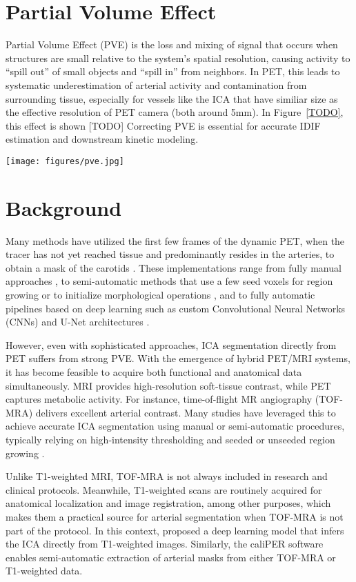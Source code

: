 \section{Partial Volume Effect}
Partial Volume Effect (PVE) is
the loss and mixing of signal that occurs when structures are small relative to the system’s spatial resolution, causing activity to “spill out” of small objects and “spill in” from neighbors.
In PET, this leads to systematic underestimation of arterial activity and contamination from surrounding tissue, especially for vessels like the ICA that have similiar size as the effective resolution of PET camera (both around 5mm).
In Figure~\ref{TODO}, this effect is shown [TODO]
Correcting PVE is essential for accurate IDIF estimation and downstream kinetic modeling.

\texttt{[image: figures/pve.jpg]}
\section{Background}
Many methods have utilized the first few frames of the dynamic PET, when the tracer has not yet reached tissue and predominantly resides in the arteries, to obtain a mask of the carotids \cite{young2023image}.
These implementations range from fully manual approaches \cite{TODO}, to semi-automatic methods that use a few seed voxels for region growing or to initialize morphological operations \cite{TODO}, and to fully automatic pipelines based on deep learning such as custom Convolutional Neural Networks (CNNs) \cite{TODO} and U-Net architectures \cite{TODO}.

However, even with sophisticated approaches, ICA segmentation directly from PET suffers from strong PVE.
With the emergence of hybrid PET/MRI systems, it has become feasible to acquire both functional and anatomical data simultaneously.
MRI provides high-resolution soft-tissue contrast, while PET captures metabolic activity.
For instance, time-of-flight MR angiography (TOF-MRA) delivers excellent arterial contrast.
Many studies have leveraged this to achieve accurate ICA segmentation using manual or semi-automatic procedures, typically relying on high-intensity thresholding and seeded or unseeded region growing \cite{TODO}.


Unlike T1-weighted MRI, TOF-MRA is not always included in research and clinical protocols.
Meanwhile, T1-weighted scans are routinely acquired for anatomical localization and image registration, among other purposes, which makes them a practical source for arterial segmentation when TOF-MRA is not part of the protocol.
In this context, \citeauthor{TODO} \cite{TODO} proposed a deep learning model that infers the ICA directly from T1-weighted images.
Similarly, the caliPER software \cite{TODO} enables semi-automatic extraction of arterial masks from either TOF-MRA or T1-weighted data.


